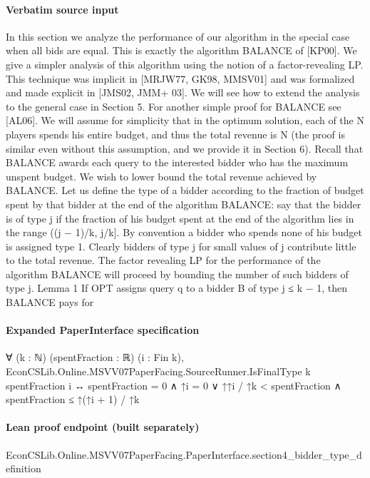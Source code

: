 \documentclass[10pt]{article}
\begin{document}
\paragraph{Verbatim source input}
\begin{ReviewVerbatim}
In this section we analyze the performance of our algorithm in the special case when all bids
are equal. This is exactly the algorithm BALANCE of [KP00]. We give a simpler analysis
of this algorithm using the notion of a factor-revealing LP. This technique was implicit in
[MRJW77, GK98, MMSV01] and was formalized and made explicit in [JMS02, JMM+ 03]. We
will see how to extend the analysis to the general case in Section 5. For another simple proof
for BALANCE see [AL06].
We will assume for simplicity that in the optimum solution, each of the N players spends
his entire budget, and thus the total revenue is N (the proof is similar even without this
assumption, and we provide it in Section 6). Recall that BALANCE awards each query to the
interested bidder who has the maximum unspent budget. We wish to lower bound the total
revenue achieved by BALANCE. Let us define the type of a bidder according to the fraction
of budget spent by that bidder at the end of the algorithm BALANCE: say that the bidder
is of type j if the fraction of his budget spent at the end of the algorithm lies in the range
((j − 1)/k, j/k]. By convention a bidder who spends none of his budget is assigned type 1.
Clearly bidders of type j for small values of j contribute little to the total revenue. The factor
revealing LP for the performance of the algorithm BALANCE will proceed by bounding the
number of such bidders of type j.
Lemma 1 If OPT assigns query q to a bidder B of type j ≤ k − 1, then BALANCE pays for
\end{ReviewVerbatim}


\paragraph{Expanded PaperInterface specification}
\begin{ReviewVerbatim}
∀ (k : ℕ) (spentFraction : ℝ) (i : Fin k),
  EconCSLib.Online.MSVV07PaperFacing.SourceRunner.IsFinalType k spentFraction i ↔
    spentFraction = 0 ∧ ↑i = 0 ∨ ↑↑i / ↑k < spentFraction ∧ spentFraction ≤ ↑(↑i + 1) / ↑k
\end{ReviewVerbatim}

\paragraph{Lean proof endpoint (built separately)}\begin{ReviewVerbatim}
EconCSLib.Online.MSVV07PaperFacing.PaperInterface.section4_bidder_type_definition
\end{ReviewVerbatim}
\end{document}
